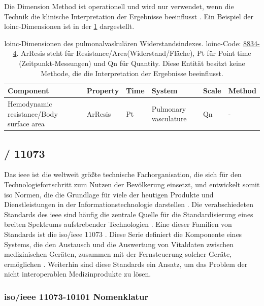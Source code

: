 Die Dimension \glqq Method\grqq{} ist operationell und wird nur verwendet, wenn die Technik die klinische Interpretation der Ergebnisse beeinflusst \cite{interop}. Ein Beispiel der \ac{loinc}-Dimensionen ist in der \ref{tab:loincdimensions} dargestellt.

\begin{table}[ht]
	\centering 
	\small 
	\caption[\acs{loinc}-Dimensionen]{\ac{loinc}-Dimensionen des pulmonalvaskulären Widerstandsindexes. \ac{loinc}-Code: \href{https://loinc.org/8834-4/}{8834-4}. ArResis steht für  Resistance/Area\grqq (Widerstand/Fläche), Pt für Point time (Zeitpunkt-Messungen) und Qn für Quantity. Diese Entität besitzt keine Methode, die die Interpretation der Ergebnisse beeinflusst.}
	\label{tab:loincdimensions}
	\begin{tabular}{|p{3cm}|l|l|p{2cm}|l|l|}
		\hline
		\bfseries Component & \bfseries Property & \bfseries Time & \bfseries System & \bfseries Scale & \bfseries Method \\ \hline
		Hemodynamic resistance/Body surface area & ArResis & Pt & Pulmonary vasculature & Qn & - \\ \hline	
	\end{tabular}
\end{table}

\subsection{/ 11073\texttrademark{}} \label{subsec:ieee}

Das \acf{ieee} ist die weltweit größte technische Fachorganisation, die sich für den Technologiefortschritt zum Nutzen der Bevölkerung einsetzt, und entwickelt somit \acf{iso} Normen, die die Grundlage für viele der heutigen Produkte und Dienstleistungen in der Informationstechnologie darstellen \cite{ieeeiso}. Die verabschiedeten Standards des \ac{ieee} sind häufig die zentrale Quelle für die Standardisierung eines breiten Spektrums aufstrebender Technologien \cite{ieeeglance}. Eine dieser Familien von Standards ist die \acs{iso}/\ac{ieee} 11073\texttrademark{} \cite{ieeeglance, ieeearch}. Diese Serie definiert die Komponente eines Systems, die den Austausch und die Auswertung von Vitaldaten zwischen medizinischen Geräten, zusammen mit der Fernsteuerung solcher Geräte, ermöglichen \cite{ieeearch}. Weiterhin sind diese Standards ein Ansatz, um das Problem der nicht interoperablen Medizinprodukte zu lösen. 

\subsubsection{\acs{iso}/\acs{ieee} 11073-10101\texttrademark{} Nomenklatur} \label{subsub:ieee1107310101}

